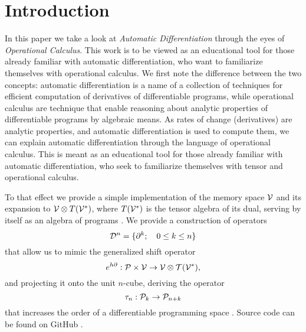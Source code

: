 \section{Introduction}\label{sec:introduction}

In this paper we take a look at \emph{Automatic Differentiation} through the eyes of \emph{Operational Calculus}. This work is to be viewed as an educational tool for those already familiar with automatic differentiation, who want to familiarize themselves with operational calculus. We first note the difference between the two concepts: automatic differentiation is a name of a collection of techniques for efficient computation of derivatives of differentiable programs, while operational calculus are technique that enable reasoning about analytic properties of differentiable programs by algebraic means. As rates of change (derivatives) are analytic properties, and automatic differentiation is used to compute them, we can explain automatic differentiation through the language of operational calculus. This is meant as an educational tool for those already familiar with automatic differentiation, who seek to familiarize themselves with tensor and operational calculus.

To that effect we provide a simple implementation of the memory space $\mathcal{V}$ and its expansion to $\mathcal{V}\otimes T(\mathcal{V}^*)$, where $T(\mathcal{V}^*)$ is the tensor algebra of its dual, serving by itself as an algebra of programs \cite[Definition~4.1]{OperationalCalculus}.
We provide a construction of operators
\begin{equation}
\mathcal{D}^n=\{\partial^k;\quad 0\le k\le n\}
\end{equation}
that allow us to mimic the generalized shift operator \cite[Theorem~5.2]{OperationalCalculus}
 \begin{equation}
                  	e^{h\partial}:\mathcal{P}\times \mathcal{V}\to \mathcal{V}\otimes \mathcal{T}(\mathcal{V}^*),
         \end{equation}
and projecting it onto the unit $n$-cube, deriving the operator 
\begin{equation}\label{eq:sumd}
\tau_n:\mathcal{P}_k\to\mathcal{P}_{n+k}
\end{equation} 
that increases the order of a differentiable programming space \cite[Proposition~5.1]{OperationalCalculus}.
Source code can be found on GitHub \cite{dCpp}.

